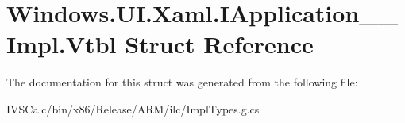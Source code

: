 \hypertarget{struct_windows_1_1_u_i_1_1_xaml_1_1_i_application_____impl_1_1_vtbl}{}\section{Windows.\+U\+I.\+Xaml.\+I\+Application\+\_\+\+\_\+\+Impl.\+Vtbl Struct Reference}
\label{struct_windows_1_1_u_i_1_1_xaml_1_1_i_application_____impl_1_1_vtbl}


The documentation for this struct was generated from the following file\+:\begin{DoxyCompactItemize}
\item 
I\+V\+S\+Calc/bin/x86/\+Release/\+A\+R\+M/ilc/Impl\+Types.\+g.\+cs\end{DoxyCompactItemize}
